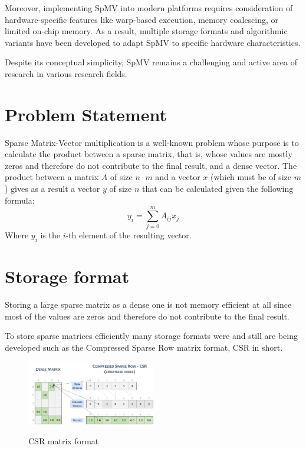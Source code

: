 \documentclass[conference]{IEEEtran}
\begin{document}
    Moreover, implementing SpMV into modern platforms requires consideration of
    hardware-specific features like warp-based execution, memory coalescing, or
    limited on-chip memory.
    As a result, multiple storage formats and algorithmic variants have been
    developed to adapt SpMV to specific hardware characteristics.

    Despite its conceptual simplicity, SpMV remains a challenging and active area
    of research in various research fields.
    
    \section{Problem Statement}

    Sparse Matrix-Vector multiplication is a well-known problem whose purpose
    is to calculate the product between a sparse matrix, that is, whose values
    are mostly zeros and therefore do not contribute to the final result, and a
    dense vector.
    The product between a matrix $A$ of size $n \cdot m$ and a vector $x$
    (which must be of size $m$) gives as a result a vector $y$ of size $n$
    that can be calculated given the following formula:
    $$
    y_i = \sum\limits_{j = 0}^{m} A_{ij} x_j
    $$
    Where $y_i$ is the $i$-th element of the resulting vector.

    \section{Storage format}

    Storing a large sparse matrix as a dense one is not memory efficient at all
    since most of the values are zeros and therefore do not contribute to the
    final result.

    To store sparse matrices efficiently many storage formats were and still
    are being developed such as the Compressed Sparse Row matrix format, CSR
    in short.

    \begin{figure}[ht]
        \caption{CSR matrix format}
        \centering
        \includegraphics[width=0.5\textwidth]{csr-format.png}
        \label{fig:csr-format}
    \end{figure}
\end{document}
